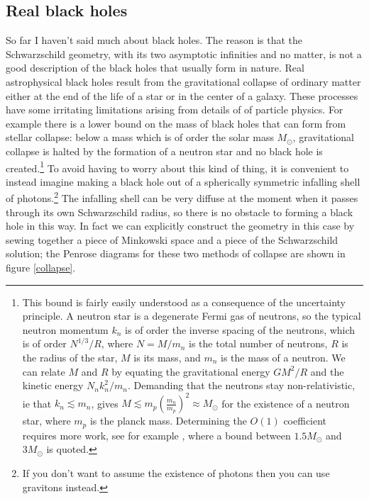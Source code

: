 \documentclass[12pt]{article}
\begin{document}
\subsection{Real black holes}\label{realsec}
So far I haven't said much about black holes.  The reason is that the Schwarzschild geometry, with its two asymptotic infinities and no matter, is not a good description of the black holes that usually form in nature.  Real astrophysical black holes result from the gravitational collapse of ordinary matter either at the end of the life of a star or in the center of a galaxy.  These processes have some irritating limitations arising from details of of particle physics.  For example there is a lower bound on the mass of black holes that can form from stellar collapse: below a mass which is of order the solar mass $M_\odot$, gravitational collapse is halted by the formation of a neutron star and no black hole is created.\footnote{This bound is fairly easily understood as a consequence of the uncertainty principle.  A neutron star is a degenerate Fermi gas of neutrons, so the typical neutron momentum $k_n$ is of order the inverse spacing of the neutrons, which is of order $N^{1/3}/R$, where $N=M/m_n$ is the total number of neutrons, $R$ is the radius of the star, $M$ is its mass, and $m_n$ is the mass of a neutron.  We can relate $M$ and $R$ by equating the gravitational energy $GM^2/R$ and the kinetic energy $N_nk_n^2/m_n$.  Demanding that the neutrons stay non-relativistic, ie that $k_n\lesssim m_n$, gives $M\lesssim m_p \left(\frac{m_n}{m_p}\right)^2\approx M_\odot$ for the existence of a neutron star, where $m_p$ is the planck mass.  Determining the $O(1)$ coefficient requires more work, see for example \cite{bombaci1996maximum}, where a bound between $1.5 M_\odot$ and $3 M_\odot$ is quoted.}   To avoid having to worry about this kind of thing, it is convenient to instead imagine making a black hole out of a spherically symmetric infalling shell of photons.\footnote{If you don't want to assume the existence of photons then you can use gravitons instead.}  The infalling shell can be very diffuse at the moment when it passes through its own Schwarzschild radius, so there is no obstacle to forming a black hole in this way.  In fact we can explicitly construct the geometry in this case by sewing together a piece of Minkowski space and a piece of the Schwarzschild solution; the Penrose diagrams for these two methods of collapse are shown in figure \ref{collapse}.
\end{document}

